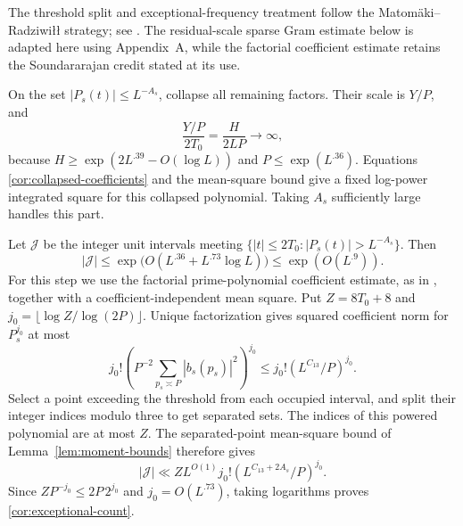 The threshold split and exceptional-frequency treatment follow the
Matom\"aki--Radziwi{\l}{\l} strategy; see
\cite[\S2.1 and Lemmas~8--9 of arXiv~v4]{MatomakiRadziwill2017}.
The residual-scale sparse Gram estimate below is adapted here using
Appendix~A, while the factorial coefficient estimate retains the
Soundararajan credit stated at its use.

On the set $|P_s(t)|\leq L^{-A_s}$, collapse all remaining factors.
Their scale is $Y/P$, and
\begin{equation}\label{cor:length-dominates-time}
 \frac{Y/P}{2T_0}=\frac H{2LP}\longrightarrow\infty,
\end{equation}
because $H\geq\exp(2L^{.39}-O(\log L))$ and
$P\leq\exp(L^{.36})$.  Equations
\eqref{cor:collapsed-coefficients} and the mean-square bound give a
fixed log-power integrated square for this collapsed polynomial.
Taking $A_s$ sufficiently large handles this part.

Let $\mathcal J$ be the integer unit intervals meeting
$\{|t|\leq2T_0:|P_s(t)|>L^{-A_s}\}$.  Then
\begin{equation}\label{cor:exceptional-count}
 |\mathcal J|\leq
 \exp\bigl(O(L^{.36}+L^{.73}\log L)\bigr)
       \leq\exp(O(L^{.9})).
\end{equation}
For this step we use the factorial prime-polynomial coefficient
estimate, as in \cite[Lemma~3 and its proof]{Soundararajan2009},
together with a coefficient-independent mean square. Put
$Z=8T_0+8$ and $j_0=\lfloor\log Z/\log(2P)\rfloor$.  Unique
factorization gives squared coefficient norm for $P_s^{j_0}$ at most
\[
 j_0!\left(P^{-2}\sum_{p_s\asymp P}|b_s(p_s)|^2\right)^{j_0}
       \leq j_0!(L^{C_{13}}/P)^{j_0}.
\]
Select a point exceeding the threshold from each occupied interval,
and split their integer indices modulo three to get separated sets.
The indices of this powered polynomial are at most $Z$.  The
separated-point mean-square bound of Lemma~\ref{lem:moment-bounds}
therefore gives
\[
 |\mathcal J|\ll ZL^{O(1)}j_0!
                       (L^{C_{13}+2A_s}/P)^{j_0}.
\]
Since $ZP^{-j_0}\leq2P\,2^{j_0}$ and
$j_0=O(L^{.73})$, taking logarithms proves
\eqref{cor:exceptional-count}.

